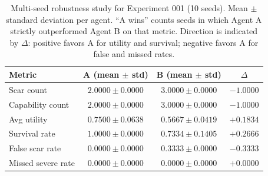 \begin{table}[h]
\centering
\caption{Multi-seed robustness study for Experiment 001 (10 seeds).
Mean $\pm$ standard deviation per agent. ``A wins'' counts seeds in
which Agent A strictly outperformed Agent B on that metric. Direction
is indicated by $\Delta$: positive favors A for utility and survival;
negative favors A for false and missed rates.}
\label{tab:multiseed}
\small
\begin{tabular}{lccc}
\hline
\textbf{Metric} & \textbf{A (mean $\pm$ std)} & \textbf{B (mean $\pm$ std)} & \textbf{$\Delta$} \\
\hline
Scar count         & $2.0000 \pm 0.0000$ & $3.0000 \pm 0.0000$ & $-1.0000$ \\
Capability count   & $2.0000 \pm 0.0000$ & $3.0000 \pm 0.0000$ & $-1.0000$ \\
Avg utility        & $0.7500 \pm 0.0638$ & $0.5667 \pm 0.0419$ & $+0.1834$ \\
Survival rate      & $1.0000 \pm 0.0000$ & $0.7334 \pm 0.1405$ & $+0.2666$ \\
False scar rate    & $0.0000 \pm 0.0000$ & $0.3333 \pm 0.0000$ & $-0.3333$ \\
Missed severe rate & $0.0000 \pm 0.0000$ & $0.0000 \pm 0.0000$ & $+0.0000$ \\
\hline
\end{tabular}
\end{table}
